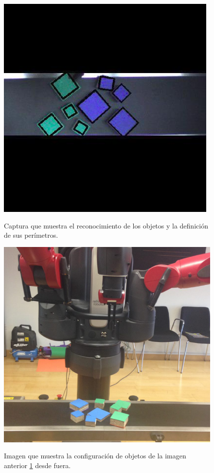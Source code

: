 \begin{figure}[H]
	\centering %
	\label{fig:capt}
	\includegraphics[scale=0.5]{imagenes/captura.jpg}
	\caption{Captura que muestra el reconocimiento de los objetos y la definición de sus perímetros.}
\end{figure}

\begin{figure}[H]
	\centering %
	\label{fig:capter}
	\includegraphics[scale=0.4]{imagenes/Baxter.png}
	\caption{Imagen que muestra la configuración de objetos de la imagen anterior \ref{fig:capt} desde fuera.}
\end{figure}

